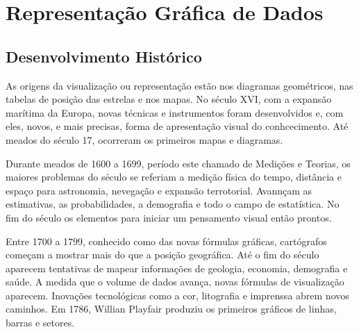 \chapter{Representação Gráfica de Dados}
\section{Desenvolvimento Histórico}

As origens da visualização ou representação estão nos diagramas geométricos, nas tabelas de posição das estrelas e nos mapas. No século XVI, com a expansão marítima da Europa, novas técnicas e instrumentos foram desenvolvidos e, com eles, novos, e mais precisas, forma de apresentação visual do conhcecimento. Até meados do século 17, ocorreram os primeiros mapas e diagramas.\vskip0.3cm


Durante meados de 1600 a 1699, período este chamado de Medições e Teorias, os maiores problemas do século se referiam a medição física do tempo, distância e espaço para astronomia, nevegação e expansão terrotorial. Avannçam as estimativas, as probabilidades, a demografia e todo o campo de estatística. No fim do século os elementos para iniciar um pensamento visual então prontos. \vskip0.3cm


\par Entre 1700 a 1799, conhecido como das novas fórmulas gráficas, cartógrafos começam a mostrar mais do que a posição geográfica. Até o fim do século aparecem tentativas de mapear informações de geologia, economia, demografia e saúde. A medida que o volume de dados avança, novas fórmulas de visualização aparecem. Inovações tecnológicas como a cor, litografia e imprenssa abrem novos caminhos. Em 1786, Willian Playfair produziu os primeiros gráficos de linhas, barras e setores.



